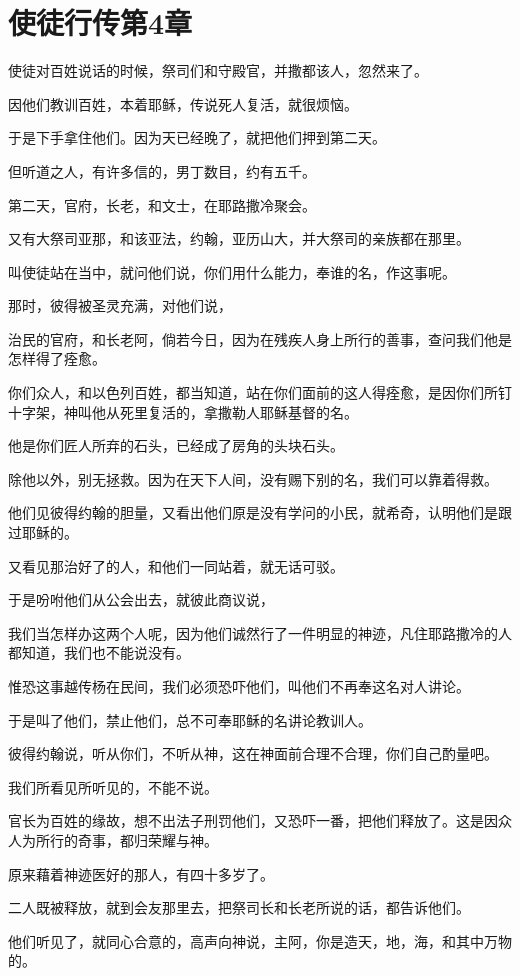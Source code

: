 \documentclass[12pt,oneside]{book}
\begin{document}
\chapter{使徒行传第4章}
使徒对百姓说话的时候，祭司们和守殿官，并撒都该人，忽然来了。

因他们教训百姓，本着耶稣，传说死人复活，就很烦恼。

于是下手拿住他们。因为天已经晚了，就把他们押到第二天。

但听道之人，有许多信的，男丁数目，约有五千。

第二天，官府，长老，和文士，在耶路撒冷聚会。

又有大祭司亚那，和该亚法，约翰，亚历山大，并大祭司的亲族都在那里。

叫使徒站在当中，就问他们说，你们用什么能力，奉谁的名，作这事呢。

那时，彼得被圣灵充满，对他们说，

治民的官府，和长老阿，倘若今日，因为在残疾人身上所行的善事，查问我们他是怎样得了痊愈。

你们众人，和以色列百姓，都当知道，站在你们面前的这人得痊愈，是因你们所钉十字架，神叫他从死里复活的，拿撒勒人耶稣基督的名。

他是你们匠人所弃的石头，已经成了房角的头块石头。

除他以外，别无拯救。因为在天下人间，没有赐下别的名，我们可以靠着得救。

他们见彼得约翰的胆量，又看出他们原是没有学问的小民，就希奇，认明他们是跟过耶稣的。

又看见那治好了的人，和他们一同站着，就无话可驳。

于是吩咐他们从公会出去，就彼此商议说，

我们当怎样办这两个人呢，因为他们诚然行了一件明显的神迹，凡住耶路撒冷的人都知道，我们也不能说没有。

惟恐这事越传杨在民间，我们必须恐吓他们，叫他们不再奉这名对人讲论。

于是叫了他们，禁止他们，总不可奉耶稣的名讲论教训人。

彼得约翰说，听从你们，不听从神，这在神面前合理不合理，你们自己酌量吧。

我们所看见所听见的，不能不说。

官长为百姓的缘故，想不出法子刑罚他们，又恐吓一番，把他们释放了。这是因众人为所行的奇事，都归荣耀与神。

原来藉着神迹医好的那人，有四十多岁了。

二人既被释放，就到会友那里去，把祭司长和长老所说的话，都告诉他们。

他们听见了，就同心合意的，高声向神说，主阿，你是造天，地，海，和其中万物的。
\end{document}
